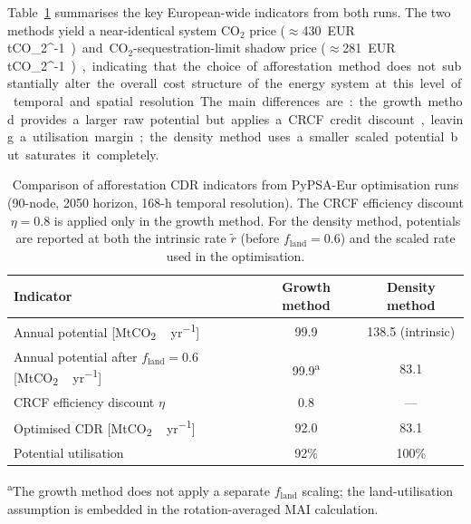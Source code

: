\documentclass[12pt, a4paper]{article}
\begin{document}
Table~\ref{tab:affo_pypsa_summary} summarises the key European-wide indicators from both runs. The two methods yield a near-identical system CO$_2$ price ($\approx$430~\si{EUR\,tCO_2^{-1}}) and CO$_2$-sequestration-limit shadow price ($\approx$281~\si{EUR\,tCO_2^{-1}}), indicating that the choice of afforestation method does not substantially alter the overall cost structure of the energy system at this level of temporal and spatial resolution. The main differences are: the growth method provides a larger raw potential but applies a CRCF credit discount, leaving a utilisation margin; the density method uses a smaller scaled potential but saturates it completely.

\begin{table}[htbp]
\centering
\caption{Comparison of afforestation CDR indicators from PyPSA-Eur optimisation runs
(90-node, 2050 horizon, 168-h temporal resolution).
The CRCF efficiency discount $\eta = 0.8$ is applied only in the growth method.
For the density method, potentials are reported at both the intrinsic rate $\tilde{r}$
(before $f_{\text{land}} = 0.6$) and the scaled rate used in the optimisation.}
\label{tab:affo_pypsa_summary}
\begin{tabular}{lcc}
\toprule
\textbf{Indicator} & \textbf{Growth method} & \textbf{Density method} \\
\midrule
Annual potential [\si{MtCO_2\,yr^{-1}}]                              & 99.9  & 138.5 (intrinsic) \\
Annual potential after $f_{\text{land}}=0.6$ [\si{MtCO_2\,yr^{-1}}] & 99.9\textsuperscript{a} & 83.1 \\
CRCF efficiency discount $\eta$                                       & 0.8   & --- \\
Optimised CDR [\si{MtCO_2\,yr^{-1}}]                                 & 92.0  & 83.1 \\
Potential utilisation                                                 & 92\%  & 100\% \\
\bottomrule
\end{tabular}
\par\vspace{4pt}
{\footnotesize \textsuperscript{a}The growth method does not apply a separate $f_{\text{land}}$ scaling; the land-utilisation assumption is embedded in the rotation-averaged MAI calculation.}
\end{table}

\newpage


\end{document}
